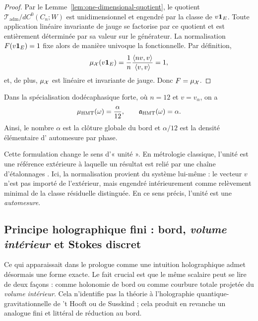 \begin{proof}
Par le Lemme~\ref{lem:one-dimensional-quotient}, le quotient
$\mathcal T_{\mathrm{adm}}/dC^0(C_n;W)$ est unidimensionnel et engendré par la classe de
$v\mathbf 1_E$. Toute application linéaire invariante de jauge se factorise par ce quotient et est
entièrement déterminée par sa valeur sur le générateur. La normalisation
$F(v\mathbf 1_E)=1$ fixe alors de manière univoque la fonctionnelle. Par définition,
\[
\mu_\mathcal X(v\mathbf 1_E)=\frac1n\frac{\langle nv,v\rangle}{\langle v,v\rangle}=1,
\]
et, de plus, $\mu_\mathcal X$ est linéaire et invariante de jauge. Donc $F=\mu_\mathcal X$.
\end{proof}

\begin{corollary}\label{cor:self-measurement-hmt}
Dans la spécialisation dodécaphasique forte, où $n=12$ et $v=v_\alpha$, on a
\[
\mu_{\mathrm{HMT}}(\omega)=\frac{\alpha}{12},
\qquad
\mathfrak a_{\mathrm{HMT}}(\omega)=\alpha.
\]
Ainsi, le nombre $\alpha$ est la clôture globale du bord et $\alpha/12$ est la densité élémentaire d'
automesure par phase.
\end{corollary}

\begin{remark}
Cette formulation change le sens d'« unité ». En métrologie classique, l'unité est une
référence extérieure à laquelle un résultat est relié par une chaîne d'étalonnages
\cite{NISTTraceability2023,BIPMSI2019}. Ici, la normalisation provient du système lui-même : le
vecteur $v$ n'est pas importé de l'extérieur, mais engendré intérieurement comme relèvement minimal de la classe
résiduelle distinguée. En ce sens précis, l'unité est une \emph{automesure}.
\end{remark}

\subsection{Principe holographique fini : bord, \emph{volume intérieur} et Stokes discret}

Ce qui apparaissait dans le prologue comme une intuition holographique admet désormais une forme exacte. Le fait
crucial est que le même scalaire peut se lire de deux façons : comme holonomie de bord ou comme
courbure totale projetée du \emph{volume intérieur}. Cela n'identifie pas la théorie à l'holographie
quantique-gravitationnelle de 't Hooft ou de Susskind \cite{tHooft1993,Susskind1995} ; cela produit en revanche
un analogue fini et littéral de réduction au bord.

